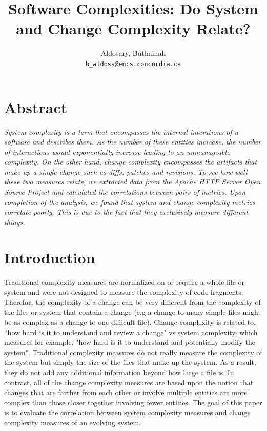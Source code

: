 \documentclass[9pt,twocolumn,a4paper]{article}
\begin{document}
\author{Aldosary, Buthainah\\
\texttt{b_aldosa@encs.concordia.ca}}

\date{}
\title{\bf{Software Complexities: Do System and Change Complexity Relate?}}




\maketitle
\section{Abstract}
{\em System complexity is a term that encompasses the internal interations of a software and describes them. As the number of these entities increase, the number of interactions would exponentially increase leading to an unmanageable complexity. On the other hand, change complexity encompasses the artifacts that make up a single change such as diffs, patches and revisions. To see how well these two measures relate, we extracted data from the Apache HTTP Server Open Source Project and calculated the correlations between pairs of metrics. Upon completion of the analysis, we found that system and change complexity metrics correlate poorly. This is due to the fact that they exclusively measure different things.

}
\section{Introduction}

Traditional complexity measures are normalized on or require a whole file or system and were not designed to measure the complexity of code fragments. Therefor, the complexity of a change can be very different from the complexity of the files or system that contain a change (e.g a change to many simple files might be as complex as a change to one difficult file). Change complexity is related to, ``how hard is it to understand and review a change" vs system complexity, which measures for example, "how hard is it to understand and potentially modify the system". Traditional complexity measures do not really measure the complexity of the system but simply the size of the files that make up the system. As a result, they do not add any additional information beyond how large a file is. In contrast, all of the change complexity measures are based upon the notion that changes that are farther from each other or involve multiple entities are more complex than those closer together involving fewer entities. The goal of this paper is to evaluate the correlation between system complexity measures and change complexity measures of an evolving system. 
\newline
\end{document}
